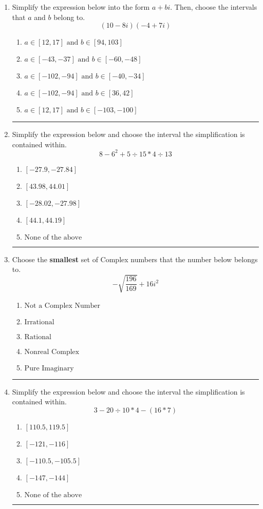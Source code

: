 \documentclass[14pt]{extbook}
\newcommand{\litem}[1]{\item#1\hspace*{-1cm}\rule{\textwidth}{0.4pt}}
\begin{document}
\begin{enumerate}
{\begin{enumerate}[label=\Alph*.]
\end{enumerate} }
\litem{
Simplify the expression below into the form $a+bi$. Then, choose the intervals that $a$ and $b$ belong to.\[ (10 - 8 i)(-4 + 7 i) \]\begin{enumerate}[label=\Alph*.]
\item \( a \in [12, 17] \text{ and } b \in [94, 103] \)
\item \( a \in [-43, -37] \text{ and } b \in [-60, -48] \)
\item \( a \in [-102, -94] \text{ and } b \in [-40, -34] \)
\item \( a \in [-102, -94] \text{ and } b \in [36, 42] \)
\item \( a \in [12, 17] \text{ and } b \in [-103, -100] \)

\end{enumerate} }
\litem{
Simplify the expression below and choose the interval the simplification is contained within.\[ 8 - 6^2 + 5 \div 15 * 4 \div 13 \]\begin{enumerate}[label=\Alph*.]
\item \( [-27.9, -27.84] \)
\item \( [43.98, 44.01] \)
\item \( [-28.02, -27.98] \)
\item \( [44.1, 44.19] \)
\item \( \text{None of the above} \)

\end{enumerate} }
\litem{
Choose the \textbf{smallest} set of Complex numbers that the number below belongs to.\[ -\sqrt{\frac{196}{169}} + 16i^2 \]\begin{enumerate}[label=\Alph*.]
\item \( \text{Not a Complex Number} \)
\item \( \text{Irrational} \)
\item \( \text{Rational} \)
\item \( \text{Nonreal Complex} \)
\item \( \text{Pure Imaginary} \)

\end{enumerate} }
\litem{
Simplify the expression below and choose the interval the simplification is contained within.\[ 3 - 20 \div 10 * 4 - (16 * 7) \]\begin{enumerate}[label=\Alph*.]
\item \( [110.5, 119.5] \)
\item \( [-121, -116] \)
\item \( [-110.5, -105.5] \)
\item \( [-147, -144] \)
\item \( \text{None of the above} \)


\end{enumerate}}
\end{enumerate}
\end{document}
